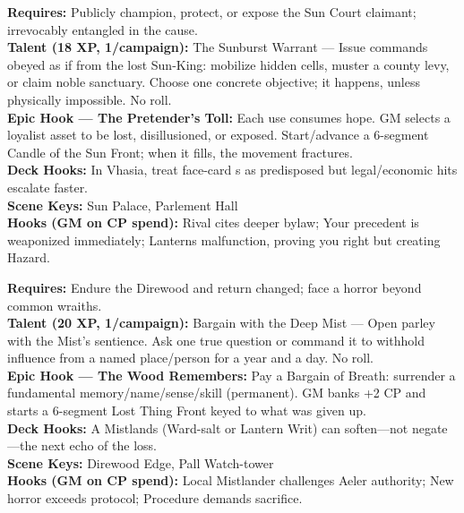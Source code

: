 \documentclass[12pt]{article}
\begin{document}
\begin{description}[leftmargin=*]
  \item[\textbf{The Last Dauphin's Shadow}] 
  \textbf{Requires:} Publicly champion, protect, or expose the Sun Court claimant; irrevocably entangled in the cause. \\
  \textbf{Talent (18 XP, 1/campaign):} The Sunburst Warrant — Issue commands obeyed as if from the lost Sun-King: mobilize hidden cells, muster a county levy, or claim noble sanctuary. Choose one concrete objective; it happens, unless physically impossible. No roll. \\
  \textbf{Epic Hook — The Pretender's Toll:} Each use consumes hope. GM selects a loyalist asset to be lost, disillusioned, or exposed. Start/advance a 6-segment Candle of the Sun Front; when it fills, the movement fractures. \\
  \textbf{Deck Hooks:} In Vhasia, treat face-card s as predisposed but legal/economic hits escalate faster. \\
  \textbf{Scene Keys:} Sun Palace, Parlement Hall \\
  \textbf{Hooks (GM on CP spend):} Rival cites deeper bylaw; Your precedent is weaponized immediately; Lanterns malfunction, proving you right but creating Hazard.

  \item[\textbf{Mist-Seer of the Weeping Gate}] 
  \textbf{Requires:} Endure the Direwood and return changed; face a horror beyond common wraiths. \\
  \textbf{Talent (20 XP, 1/campaign):} Bargain with the Deep Mist — Open parley with the Mist's sentience. Ask one true question or command it to withhold influence from a named place/person for a year and a day. No roll. \\
  \textbf{Epic Hook — The Wood Remembers:} Pay a Bargain of Breath: surrender a fundamental memory/name/sense/skill (permanent). GM banks +2 CP and starts a 6-segment Lost Thing Front keyed to what was given up. \\
  \textbf{Deck Hooks:} A Mistlands (Ward-salt or Lantern Writ) can soften—not negate—the next echo of the loss. \\
  \textbf{Scene Keys:} Direwood Edge, Pall Watch-tower \\
  \textbf{Hooks (GM on CP spend):} Local Mistlander challenges Aeler authority; New horror exceeds protocol; Procedure demands sacrifice.


\end{description}
\end{document}
